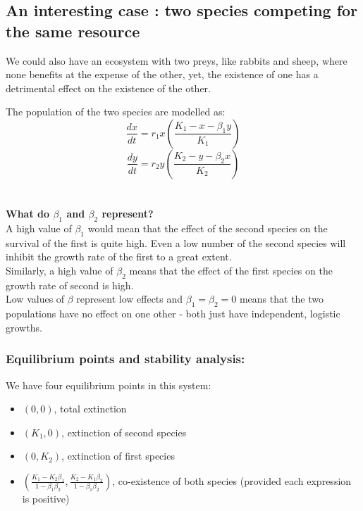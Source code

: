 \documentclass{article}
\begin{document}
\subsection{An interesting case : two species competing for the same resource}

We could also have an ecosystem with two preys, like rabbits and sheep, where none benefits at the expense of the other, yet, the existence of one has a detrimental effect on the existence of the other.

The population of the two species are modelled as:
$$\frac{dx}{dt} = r_1x \left(\frac{K_1 - x - \beta_1 y}{K_1}\right)$$
$$\frac{dy}{dt} = r_2y \left(\frac{K_2 - y - \beta_2 x}{K_2}\right)$$
\\
\\
\textbf{What do $\beta_1$ and $\beta_2$ represent?}\\
A high value of $\beta_1$ would mean that the effect of the second species on the survival of the first is quite high. Even a low number of the second species will inhibit the growth rate of the first to a great extent.\\
Similarly, a high value of $\beta_2$ means that the effect of the first species on the growth rate of second is high.\\
Low values of $\beta$ represent low effects and $\beta_1 = \beta_2 = 0$ means that the two populations have no effect on one other - both just have independent, logistic growths.

\subsubsection{Equilibrium points and stability analysis:}

We have four equilibrium points in this system:
\begin{itemize}
    \item $(0, 0)$, total extinction
    \item $(K_1, 0)$, extinction of second species
    \item $(0, K_2)$, extinction of first species
    \item $\left(\frac{K_1 - K_2\beta_1}{1 - \beta_1\beta_2}, \frac{K_2 - K_1\beta_2}{1 - \beta_1\beta_2} \right)$, co-existence of both species (provided each expression is positive)
\end{itemize}
\end{document}
